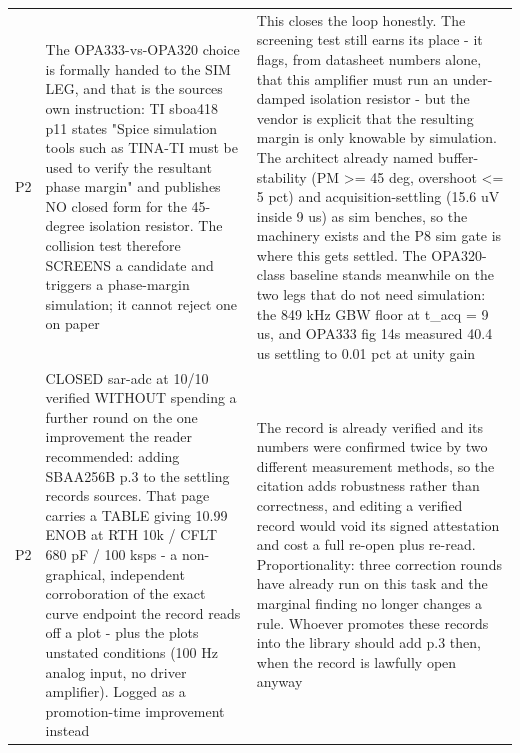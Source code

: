 \documentclass[11pt,a4paper]{article}
\begin{document}
{\begin{longtable}{lp{5.2cm}p{7.2cm}}
P2 & The OPA333-vs-OPA320 choice is formally handed to the SIM LEG, and that is the sources own instruction: TI sboa418 p11 states "Spice simulation tools such as TINA-TI must be used to verify the resultant phase margin" and publishes NO closed form for the 45-degree isolation resistor. The collision test therefore SCREENS a candidate and triggers a phase-margin simulation; it cannot reject one on paper & This closes the loop honestly. The screening test still earns its place - it flags, from datasheet numbers alone, that this amplifier must run an under-damped isolation resistor - but the vendor is explicit that the resulting margin is only knowable by simulation. The architect already named buffer-stability (PM \textgreater{}= 45 deg, overshoot \textless{}= 5 pct) and acquisition-settling (15.6 uV inside 9 us) as sim benches, so the machinery exists and the P8 sim gate is where this gets settled. The OPA320-class baseline stands meanwhile on the two legs that do not need simulation: the 849 kHz GBW floor at t\_acq = 9 us, and OPA333 fig 14s measured 40.4 us settling to 0.01 pct at unity gain \\
P2 & CLOSED sar-adc at 10/10 verified WITHOUT spending a further round on the one improvement the reader recommended: adding SBAA256B p.3 to the settling records sources. That page carries a TABLE giving 10.99 ENOB at RTH 10k / CFLT 680 pF / 100 ksps - a non-graphical, independent corroboration of the exact curve endpoint the record reads off a plot - plus the plots unstated conditions (100 Hz analog input, no driver amplifier). Logged as a promotion-time improvement instead & The record is already verified and its numbers were confirmed twice by two different measurement methods, so the citation adds robustness rather than correctness, and editing a verified record would void its signed attestation and cost a full re-open plus re-read. Proportionality: three correction rounds have already run on this task and the marginal finding no longer changes a rule. Whoever promotes these records into the library should add p.3 then, when the record is lawfully open anyway \\

\end{longtable}}
\end{document}
